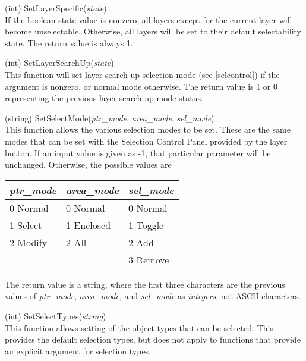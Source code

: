 \begin{description}
\item{(int) \vt SetLayerSpecific({\it state\/})}\\
If the boolean state value is nonzero, all layers except for the
current layer will become unselectable.  Otherwise, all layers will be
set to their default selectability state.  The return value is always
1.

\item{(int) \vt SetLayerSearchUp({\it state\/})}\\
This function will set layer-search-up selection mode (see
\ref{selcontrol}) if the argument is nonzero, or normal mode
otherwise.  The return value is 1 or 0 representing the previous
layer-search-up mode status.

\item{(string) \vt SetSelectMode({\it ptr\_mode\/}, {\it area\_mode\/},
  {\it sel\_mode\/})}\\
This function allows the various selection modes to be set.  These are
the same modes that can be set with the {\cb Selection Control Panel}
provided by the {\cb layer} button.  If an input value is given as -1,
that particular parameter will be unchanged.  Otherwise, the possible
values are

\begin{tabular}{|l|l|l|} \hline
\it ptr\_mode & \it area\_mode & \it sel\_mode\\ \hline
0 Normal & 0 Normal   & 0 Normal\\ \hline
1 Select & 1 Enclosed & 1 Toggle\\ \hline
2 Modify & 2 All      & 2 Add\\ \hline
         &            & 3 Remove\\ \hline
\end{tabular}

The return value is a string, where the first three characters are the
previous values of {\it ptr\_mode}, {\it area\_mode}, and {\it
sel\_mode} as {\it integers}, not ASCII characters.

\item{(int) \vt SetSelectTypes({\it string\/})}\\
This function allows setting of the object types that can be selected. 
This provides the default selection types, but does not apply to
functions that provide an explicit argument for selection types.
  

\end{description}
